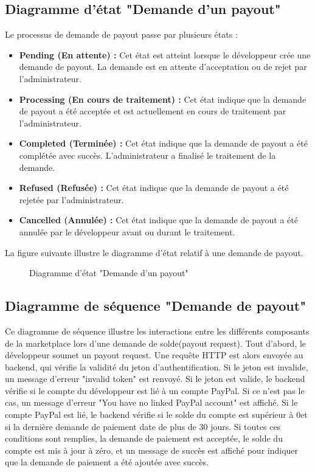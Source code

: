 \subsection{Diagramme d'état "Demande d'un payout"}
Le processus de demande de payout passe par plusieurs états :
\begin{itemize}
    \item \textbf{Pending (En attente) :} Cet état est atteint lorsque le développeur crée une demande de payout. La demande est en attente d'acceptation ou de rejet par l'administrateur.
    \item \textbf{Processing (En cours de traitement) :} Cet état indique que la demande de payout a été acceptée et est actuellement en cours de traitement par l'administrateur.
    \item \textbf{Completed (Terminée) :} Cet état indique que la demande de payout a été complétée avec succès. L'administrateur a finalisé le traitement de la demande.
    \item \textbf{Refused (Refusée) :} Cet état indique que la demande de payout a été rejetée par l'administrateur.
    \item \textbf{Cancelled (Annulée) :} Cet état indique que la demande de payout a été annulée par le développeur avant ou durant le traitement.
\end{itemize}
La figure suivante illustre le diagramme d’état relatif à une demande de payout.
\begin{figure}[H]
    \centering
    \caption{Diagramme d'état "Demande d'un payout"}
    \label{fig:logo_tt}
\end{figure}

\pagebreak

\subsection{Diagramme de séquence "Demande de payout"}
Ce diagramme de séquence illustre les interactions entre les différents composants de la marketplace lors d'une demande de solde(payout request). Tout d'abord, le développeur soumet un payout request. Une requête HTTP est alors envoyée au backend, qui vérifie la validité du jeton d'authentification. Si le jeton est invalide, un message d'erreur "invalid token" est renvoyé. Si le jeton est valide, le backend vérifie si le compte du développeur est lié à un compte PayPal. Si ce n'est pas le cas, un message d'erreur "You have no linked PayPal account" est affiché. Si le compte PayPal est lié, le backend vérifie si le solde du compte est supérieur à 0et si la dernière demande de paiement date de plus de 30 jours. Si toutes ces conditions sont remplies, la demande de paiement est acceptée, le solde du compte est mis à jour à zéro, et un message de succès est affiché pour indiquer que la demande de paiement a été ajoutée avec succès.


